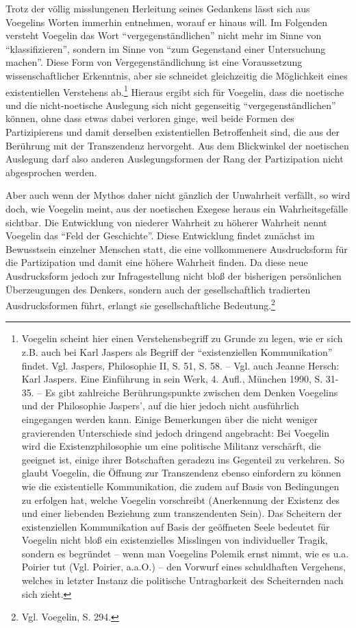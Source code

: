 Trotz der völlig misslungenen Herleitung seines Gedankens lässt sich aus
Voegelins Worten immerhin entnehmen, worauf er hinaus will. Im Folgenden
versteht Voegelin das Wort "`vergegenständlichen"' nicht mehr im Sinne von
"`klassifizieren"', sondern im Sinne von "`zum Gegenstand einer Untersuchung
machen"'. Diese Form von Vergegenständlichung ist eine Voraussetzung
wissenschaftlicher Erkenntnis, aber sie schneidet gleichzeitig die Möglichkeit
eines existentiellen Verstehens ab.\footnote{Voegelin scheint hier einen
  Verstehensbegriff zu Grunde zu legen, wie er sich z.B. auch bei Karl Jaspers
  als Begriff der "`existenziellen Kommunikation"' findet. Vgl. Jaspers,
  Philosophie II, S. 51, S. 58. -- Vgl. auch Jeanne Hersch: Karl Jaspers. Eine
  Einführung in sein Werk, 4. Aufl., München 1990, S. 31-35. -- Es gibt
  zahlreiche Berührungspunkte zwischen dem Denken Voegelins und der
  Philosophie Jaspers', auf die hier jedoch nicht ausführlich eingegangen
  werden kann. Einige Bemerkungen über die nicht weniger gravierenden
  Unterschiede sind jedoch dringend angebracht: Bei Voegelin wird die
  Existenzphilosophie um eine politische Militanz verschärft, die geeignet
  ist, einige ihrer Botschaften geradezu ins Gegenteil zu verkehren. So glaubt
  Voegelin, die Öffnung zur Transzendenz ebenso einfordern zu können wie die
  existentielle Kommunikation, die zudem auf Basis von Bedingungen zu erfolgen
  hat, welche Voegelin vorschreibt (Anerkennung der Existenz des und einer
  liebenden Beziehung zum transzendenten Sein). Das Scheitern der
  existenziellen Kommunikation auf Basis der geöffneten Seele bedeutet für
  Voegelin nicht bloß ein existenzielles Misslingen von individueller Tragik,
  sondern es begründet -- wenn man Voegelins Polemik ernst nimmt, wie es u.a.
  Poirier tut (Vgl. Poirier, a.a.O.) -- den Vorwurf eines schuldhaften
  Vergehens, welches in letzter Instanz die politische Untragbarkeit des
  Scheiternden nach sich zieht.} Hieraus ergibt sich für Voegelin, dass die
noetische und die nicht-noetische Auslegung sich nicht gegenseitig
"`vergegenständlichen"' können, ohne dass etwas dabei verloren ginge, weil
beide Formen des Partizipierens und damit derselben existentiellen
Betroffenheit sind, die aus der Berührung mit der Transzendenz hervorgeht. Aus
dem Blickwinkel der noetischen Auslegung darf also anderen Auslegungsformen
der Rang der Partizipation nicht abgesprochen werden.
 
Aber auch wenn der Mythos daher nicht gänzlich der Unwahrheit verfällt, so
wird doch, wie Voegelin meint, aus der noetischen Exegese heraus ein
Wahrheitsgefälle sichtbar. Die Entwicklung von niederer Wahrheit zu höherer
Wahrheit nennt Voegelin das "`Feld der Geschichte"'. Diese Entwicklung findet
zunächst im Bewusstsein einzelner Menschen statt, die eine vollkommenere
Ausdrucksform für die Partizipation und damit eine höhere Wahrheit finden. Da
diese neue Ausdrucksform jedoch zur Infragestellung nicht bloß der bisherigen
persönlichen Überzeugungen des Denkers, sondern auch der gesellschaftlich
tradierten Ausdrucksformen führt, erlangt sie gesellschaftliche
Bedeutung.\footnote{Vgl. Voegelin, S. 294.}
 
